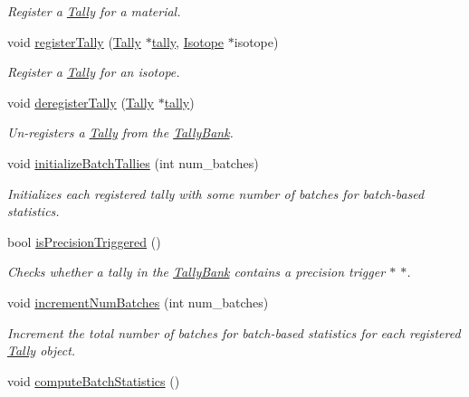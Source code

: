 \begin{DoxyCompactItemize}
\begin{DoxyCompactList}\small\item\em Register a \hyperlink{classTally}{Tally} for a material. \end{DoxyCompactList}\item 
void \hyperlink{classTallyBank_afa78d302d6665bdbe407f2c126f218ce}{register\-Tally} (\hyperlink{classTally}{Tally} $\ast$\hyperlink{classTallyBank_a929908afec2f18a4321b29beb52877f2}{tally}, \hyperlink{classIsotope}{Isotope} $\ast$isotope)
\begin{DoxyCompactList}\small\item\em Register a \hyperlink{classTally}{Tally} for an isotope. \end{DoxyCompactList}\item 
void \hyperlink{classTallyBank_aff3fd46f3afb08f88f6baf1dec94da51}{deregister\-Tally} (\hyperlink{classTally}{Tally} $\ast$\hyperlink{classTallyBank_a929908afec2f18a4321b29beb52877f2}{tally})
\begin{DoxyCompactList}\small\item\em Un-\/registers a \hyperlink{classTally}{Tally} from the \hyperlink{classTallyBank}{Tally\-Bank}. \end{DoxyCompactList}\item 
void \hyperlink{classTallyBank_af968ec74da43d04da68c39cb6d69c5ca}{initialize\-Batch\-Tallies} (int num\-\_\-batches)
\begin{DoxyCompactList}\small\item\em Initializes each registered tally with some number of batches for batch-\/based statistics. \end{DoxyCompactList}\item 
bool \hyperlink{classTallyBank_adea9d4feafcbed060abc21d24d81c990}{is\-Precision\-Triggered} ()
\begin{DoxyCompactList}\small\item\em Checks whether a tally in the \hyperlink{classTallyBank}{Tally\-Bank} contains a precision trigger $\ast$ $\ast$. \end{DoxyCompactList}\item 
void \hyperlink{classTallyBank_af9e829d18a91b2ffa3196bad35db4d73}{increment\-Num\-Batches} (int num\-\_\-batches)
\begin{DoxyCompactList}\small\item\em Increment the total number of batches for batch-\/based statistics for each registered \hyperlink{classTally}{Tally} object. \end{DoxyCompactList}\item 
\hypertarget{classTallyBank_af3de613ba9ec0fd23c4c459b6fdda7f4}{void \hyperlink{classTallyBank_af3de613ba9ec0fd23c4c459b6fdda7f4}{compute\-Batch\-Statistics} ()}\label{classTallyBank_af3de613ba9ec0fd23c4c459b6fdda7f4}


\end{DoxyCompactItemize}

